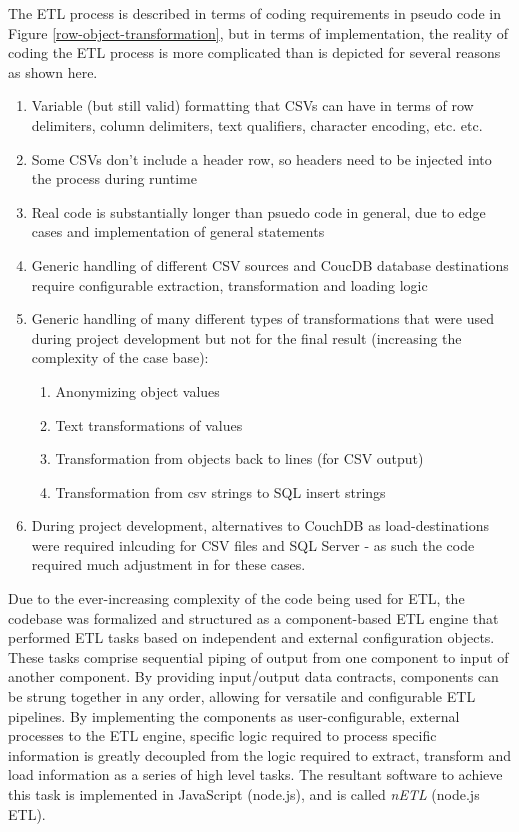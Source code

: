 The ETL process is described in terms of coding requirements in pseudo code in Figure \ref{row-object-transformation}, but in terms of implementation, the reality of coding the ETL process is more complicated than is depicted for several reasons as shown here.

\begin{enumerate}
    \item Variable (but still valid) formatting that CSVs can have in terms of row delimiters, column delimiters, text qualifiers, character encoding, etc. etc.
    \item Some CSVs don't include a header row, so headers need to be injected into the process during runtime
    \item Real code is substantially longer than psuedo code in general, due to edge cases and implementation of general statements
    \item Generic handling of different CSV sources and CoucDB database destinations require configurable extraction, transformation and loading logic
    \item Generic handling of many different types of transformations that were used during project development but not for the final result (increasing the complexity of the case base):
          \begin{enumerate}
              \item Anonymizing object values
              \item Text transformations of values
              \item Transformation from objects back to lines (for CSV output)
              \item Transformation from csv strings to SQL insert strings
          \end{enumerate}
    \item During project development, alternatives to CouchDB as load-destinations were required inlcuding for CSV files and SQL Server - as such the code required much adjustment in for these cases.
\end{enumerate}

Due to the ever-increasing complexity of the code being used for ETL, the codebase was formalized and structured as a component-based ETL engine that performed ETL tasks based on independent and external configuration objects. These tasks comprise sequential piping of output from one component to input of another component. By providing input/output data contracts, components can be strung together in any order, allowing for versatile and configurable ETL pipelines. By implementing the components as user-configurable, external processes to the ETL engine, specific logic required to process specific information is greatly decoupled from the logic required to extract, transform and load information as a series of high level tasks. The resultant software to achieve this task is implemented in JavaScript (node.js), and is called \textit{nETL} (node.js ETL).

